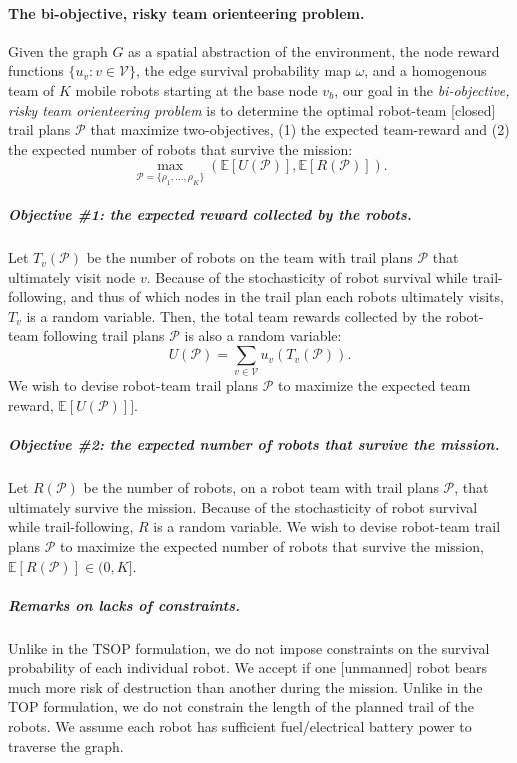 \documentclass[11pt, oneside]{article}
\begin{document}
\paragraph{The bi-objective, risky team orienteering problem.}
Given the graph $G$ as a spatial abstraction of the environment, the node reward functions $\{u_v : v \in\mathcal{V}\}$, the edge survival probability map $\omega$, and a homogenous team of $K$ mobile robots starting at the base node $v_b$, our goal in the \emph{bi-objective, risky team orienteering problem} is to determine the optimal robot-team [closed] trail plans $\mathcal{P}$ that maximize two-objectives, (1) the expected team-reward and (2) the expected number of robots that survive the mission:
\begin{equation}
\max_{\mathcal{P}=\{\rho_1, ..., \rho_K\}} \left( \mathbb{E}[U(\mathcal{P})], \mathbb{E}[R(\mathcal{P})] \right).
\label{eq:the_two_objs}
\end{equation}

\vspace{-\baselineskip}
\subparagraph{Objective \#1: the expected reward collected by the robots.}
Let $T_v(\mathcal{P}) $ be the number of robots on the team with trail plans $\mathcal{P}$ that ultimately visit node $v$.
Because of the stochasticity of robot survival while trail-following, and thus of which nodes in the trail plan each robots ultimately visits, $T_v$ is a random variable.
Then, the total team rewards collected by the robot-team following trail plans $\mathcal{P}$ is also a random variable:
\begin{equation}
U(\mathcal{P}) = \sum_{v\in\mathcal{V}} u_v\left ( T_v(\mathcal{P}) \right).
\end{equation}
We wish to devise robot-team trail plans $\mathcal{P}$ to maximize the expected team reward, $\mathbb{E}[U(\mathcal{P})]]$.

\vspace{-\baselineskip}
\subparagraph{Objective \#2: the expected number of robots that survive the mission.}
Let $R(\mathcal{P})$ be the number of robots, on a robot team with trail plans $\mathcal{P}$, that ultimately survive the mission. Because of the stochasticity of robot survival while trail-following, $R$ is a random variable. We wish to devise robot-team trail plans $\mathcal{P}$ to maximize the expected number of robots that survive the mission, $\mathbb{E}[R(\mathcal{P})] \in (0, K]$.

\subparagraph{Remarks on lacks of constraints.} 
Unlike in the TSOP formulation, we do not impose constraints on the survival probability of each individual robot. We accept if one [unmanned] robot bears much more risk of destruction than another during the mission. 
Unlike in the TOP formulation, we do not constrain the length of the planned trail of the robots. We assume each robot has sufficient fuel/electrical battery power to traverse the graph.
\end{document}
